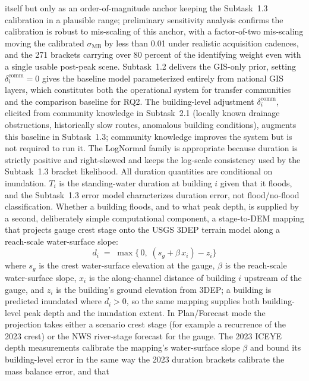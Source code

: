 \documentclass[11pt]{article}
\begin{document}
itself but only as an order-of-magnitude anchor keeping the Subtask~1.3
calibration in a plausible range; preliminary sensitivity analysis confirms the
calibration is robust to mis-scaling of this anchor, with a factor-of-two
mis-scaling moving the calibrated $\sigma_{\mathrm{MB}}$ by less than 0.01 under
realistic acquisition cadences, and the 271 brackets carrying over 80 percent of
the identifying weight even with a single usable post-peak scene.
Subtask~1.2 delivers the GIS-only prior, setting $\delta_i^{\mathrm{comm}} = 0$
gives the baseline model parameterized entirely from national GIS layers, which
constitutes both the operational system for transfer communities and the comparison
baseline for RQ2.
The building-level adjustment $\delta_i^{\mathrm{comm}}$, elicited from community
knowledge in Subtask~2.1 (locally known drainage obstructions, historically slow
routes, anomalous building conditions), augments this baseline in Subtask~1.3;
community knowledge improves the system but is not required to run it.
The LogNormal family is appropriate because duration is strictly positive and right-skewed and keeps the log-scale consistency used by the Subtask~1.3 bracket likelihood. All duration quantities are conditional on inundation. $T_i$ is the standing-water duration at building $i$ given that it floods, and the Subtask~1.3 error model characterizes duration error, not flood/no-flood classification.
Whether a building floods, and to what peak depth, is supplied by a second,
deliberately simple computational component, a stage-to-DEM mapping that projects
gauge crest stage onto the USGS 3DEP terrain model along a reach-scale
water-surface slope:
\begin{equation}\label{eq:stagedem}
  d_i \;=\; \max\bigl\{\,0,\; (s_g + \beta\, x_i) - z_i \bigr\}
\end{equation}
where $s_g$ is the crest water-surface elevation at the gauge, $\beta$ is the
reach-scale water-surface slope, $x_i$ is the along-channel distance of building
$i$ upstream of the gauge, and $z_i$ is the building's ground elevation from
3DEP; a building is predicted inundated where $d_i > 0$, so the same mapping
supplies both building-level peak depth and the inundation extent.
In Plan/Forecast mode the projection takes either a scenario crest stage (for example a recurrence of the 2023 crest) or the NWS river-stage forecast for the gauge.
The 2023 ICEYE depth measurements calibrate the mapping's water-surface slope
$\beta$ and bound its building-level error in
the same way the 2023 duration brackets calibrate the mass balance error, and that
\end{document}
